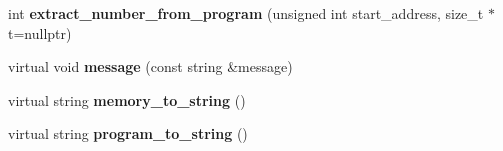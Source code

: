 \begin{DoxyCompactItemize}
int {\bfseries extract\+\_\+number\+\_\+from\+\_\+program} (unsigned int start\+\_\+address, size\+\_\+t $\ast$t=nullptr)
\item 
\mbox{\label{classVirtualMachine_a82d86e8e22643a11278cd9f05b5addff}} 
virtual void {\bfseries message} (const string \&message)
\item 
\mbox{\label{classVirtualMachine_a9b4a8d2a6b18f98f3bd00390bed78a79}} 
virtual string {\bfseries memory\+\_\+to\+\_\+string} ()
\item 
\mbox{\label{classVirtualMachine_a13c1e801e7d9a8afae6c92902044cc45}} 
virtual string {\bfseries program\+\_\+to\+\_\+string} ()
\end{DoxyCompactItemize}
